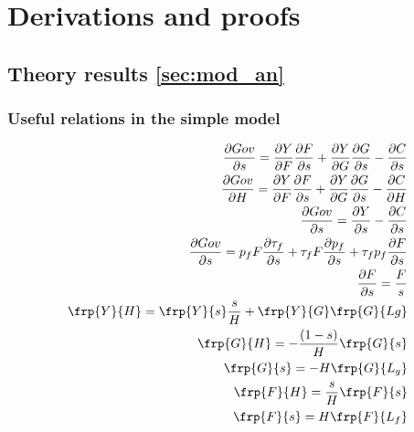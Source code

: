 \clearpage
\appendix
\section{Derivations and proofs}\label{app:derivations}

\subsection{Theory results \ref{sec:mod_an}}
\subsubsection{Useful relations in the simple model}\label{app:dervs_use}
\begin{align*}
\frac{\partial Gov}{\partial s}=\frac{\partial Y}{\partial F}\frac{\partial F}{\partial s}+\frac{\partial Y}{\partial G}\frac{\partial G}{\partial s}-\frac{\partial C}{\partial s}\\
\frac{\partial Gov}{\partial H}=\frac{\partial Y}{\partial F}\frac{\partial F}{\partial s}+\frac{\partial Y}{\partial G}\frac{\partial G}{\partial s}-\frac{\partial C}{\partial H}\\
\frac{\partial Gov}{\partial s}=\frac{\partial Y}{\partial s}-\frac{\partial C}{\partial s}\\
\frac{\partial Gov}{\partial s}=p_f F \frac{\partial \tau_f}{\partial s}+\tau_f F \frac{\partial p_f}{\partial s}+\tau_f p_f \frac{\partial F}{\partial s}\\
\frac{\partial F}{\partial s}=\frac{F}{s}
\\
\frp{Y}{H}= \frp{Y}{s}\frac{s}{H}+\frp{Y}{G}\frp{G}{Lg}
\\
\frp{G}{H}=-\frac{(1-s)}{H}\frp{G}{s}
\\\frp{G}{s}=-H\frp{G}{L_g}\\
\frp{F}{H}=\frac{s}{H}\frp{F}{s}\\
\frp{F}{s}=H\frp{F}{L_f}
\end{align*}


